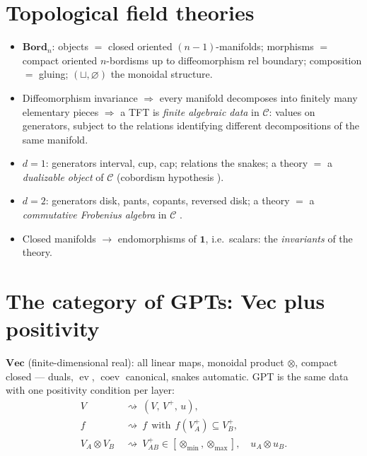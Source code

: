\documentclass[prl,aps,10pt,superscriptaddress,floatfix]{revtex4-2}
\begin{document}
\section{Topological field theories}\label{sec:tft}

\begin{itemize}
\item $\mathbf{Bord}_n$: objects $=$ closed oriented $(n-1)$-manifolds; morphisms $=$ compact oriented $n$-bordisms up to diffeomorphism rel boundary; composition $=$ gluing; $(\sqcup,\varnothing)$ the monoidal structure.
\item Diffeomorphism invariance $\Rightarrow$ every manifold decomposes into finitely many elementary pieces $\Rightarrow$ a TFT is \emph{finite algebraic data} in $\mathcal C$: values on generators, subject to the relations identifying different decompositions of the same manifold.
\item $d=1$: generators interval, cup, cap; relations the snakes; a theory $=$ a \emph{dualizable object} of $\mathcal C$ (cobordism hypothesis \cite{Lurie2009}).
\item $d=2$: generators disk, pants, copants, reversed disk; a theory $=$ a \emph{commutative Frobenius algebra} in $\mathcal C$ \cite{Dijkgraaf1989,Abrams1996,Kock2004}.
\item Closed manifolds $\to$ endomorphisms of $\mathbf 1$, i.e.\ scalars: the \emph{invariants} of the theory.
\end{itemize}

\section{The category of GPTs: Vec plus positivity}\label{sec:gpt}

$\mathbf{Vec}$ (finite-dimensional real): all linear maps, monoidal product $\otimes$, compact closed --- duals, $\operatorname{ev}$, $\operatorname{coev}$ canonical, snakes automatic. GPT is the same data with one positivity condition per layer:
\[
\begin{aligned}
V\ &\rightsquigarrow\ (V,\,V^+,\,u),\\[2pt]
f\ &\rightsquigarrow\ f\ \ \text{with}\ \ f(V_A^+)\subseteq V_B^+,\\[2pt]
V_A\otimes V_B\ &\rightsquigarrow\ V_{AB}^+\in[\otimes_{\min},\otimes_{\max}],\quad u_A\otimes u_B.
\end{aligned}
\]
\end{document}
